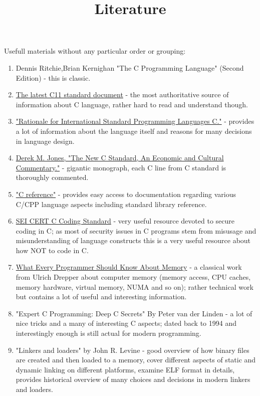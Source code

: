 \documentclass{article}
\begin{document}
\title{Literature}
{\Large Usefull materials without any particular order or grouping:}
\begin{enumerate}
\item Dennis Ritchie,Brian Kernighan "The C Programming Language" (Second Edition) - this is classic.
\item \href{http://www.open-std.org/jtc1/sc22/wg14/www/docs/n1548.pdf}{The latest C11 standard document} - the most authoritative source of information about C language, rather hard to read and understand though.
\item \href{http://www.open-std.org/jtc1/sc22/wg14/www/C99RationaleV5.10.pdf}{"Rationale for International Standard Programming Languages C."} - provides a lot of information about the language itself and reasons for many decisions in language design.
\item \href{http://people.ece.cornell.edu/land/courses/ece4760/cbook1_1.pdf}{Derek M. Jones, "The New C Standard, An Economic and Cultural Commentary."} - gigantic monograph, each C line from C standard is thoroughly commented.
\item \href{http://en.cppreference.com/w/c}{"C reference"} - provides easy access to documentation regarding various C/CPP language aspects including standard library reference.
\item \href{https://www.securecoding.cert.org/confluence/display/c/SEI+CERT+C+Coding+Standard}{SEI CERT C Coding Standard} - very useful resource devoted to secure coding in C; as most of security issues in C programs stem from misusage and misunderstanding of language constructs this is a very useful resource about how NOT to code in C.
\item \href{https://www.akkadia.org/drepper/cpumemory.pdf}{What Every Programmer Should Know About Memory} - a classical work from Ulrich Drepper about computer memory (memory access, CPU caches, memory hardware, virtual memory, NUMA and so on); rather technical work but contains a lot of useful and interesting information.
\item "Expert C Programming: Deep C Secrets" By Peter van der Linden - a lot of nice tricks and a many of interesting C aspects; dated back to 1994 and interestingly enough is still actual for modern programming.
\item "Linkers and loaders" by John R. Levine - good overview of how binary files are created and then loaded to a memory, cover different aspects of static and dynamic linking on different platforms, examine ELF format in details, provides historical overview of many choices and decisions in modern linkers and loaders.

\end{enumerate}
\end{document}
